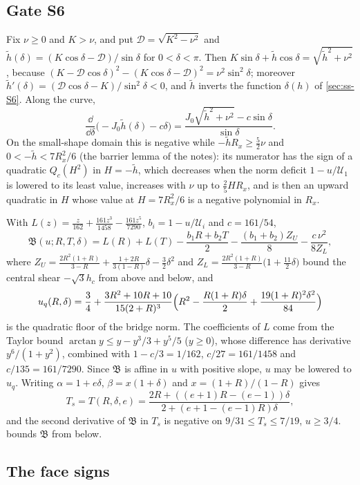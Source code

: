 \subsection{Gate S6}\label{app:ss-S6}

 Fix $\nu\ge0$ and $K>\nu$, and put $\mathcal D=\sqrt{K^2-\nu^2}$ and
$\tilde h(\delta)=(K\cos\delta-\mathcal D)/\sin\delta$ for $0<\delta<\pi$. Then
$K\sin\delta+\tilde h\cos\delta=\sqrt{\tilde h^2+\nu^2}$, because
$(K-\mathcal D\cos\delta)^2-(K\cos\delta-\mathcal D)^2=\nu^2\sin^2\delta$; moreover
$\tilde h'(\delta)=(\mathcal D\cos\delta-K)/\sin^2\delta<0$, and $\tilde h$ inverts the function
$\delta(h)$ of \cref{sec:ss-S6}. Along the curve,
\[
  \frac{\dd}{\dd\delta}\bigl(-J_0\tilde h(\delta)-c\delta\bigr)
  =\frac{J_0\sqrt{\tilde h^2+\nu^2}-c\sin\delta}{\sin\delta}.
\]
On the small-shape domain this is negative while $-\tilde hR_x\ge\frac52\nu$ and
$0<-\tilde h<7R_x^2/6$ (the barrier lemma of the notes): its numerator has the sign of a quadratic
$Q_c(H^2)$ in $H=-\tilde h$, which decreases when the norm deficit $1-u/\mathcal U_1$ is lowered to
its least value, increases with $\nu$ up to $\frac25HR_x$, and is then an upward quadratic in $H$
whose value at $H=7R_x^2/6$ is a negative polynomial in $R_x$.

 With $L(z)=\frac{z}{162}+\frac{161z^3}{1458}-\frac{161z^5}{7290}$,
$b_i=1-u/\mathcal U_i$ and $c=161/54$,
\[
  \mathfrak B(u;R,T,\delta)=L(R)+L(T)-\frac{b_1R+b_2T}{2}-\frac{(b_1+b_2)Z_U}{8}
   -\frac{c\,\nu^2}{8Z_L},
\]
where $Z_U=\frac{2R^2(1+R)}{3-R}+\frac{1+2R}{3(1-R)}\delta-\frac32\delta^2$ and
$Z_L=\frac{2R^2(1+R)}{3-R}\bigl(1+\frac{11}{2}\delta\bigr)$ bound the central shear $-\sqrt3h_c$
from above and below, and
\[
  u_q(R,\delta)=\frac34+\frac{3R^2+10R+10}{15(2+R)^3}\Bigl(R^2-\frac{R(1+R)\delta}{2}
   +\frac{19(1+R)^2\delta^2}{84}\Bigr)
\]
is the quadratic floor of the bridge norm. The coefficients of $L$ come from the Taylor bound
$\arctan y\le y-y^3/3+y^5/5$ ($y\ge0$), whose difference has derivative $y^6/(1+y^2)$, combined
with $1-c/3=1/162$, $c/27=161/1458$ and $c/135=161/7290$. Since $\mathfrak B$ is affine in $u$
with positive slope, $u$ may be lowered to $u_q$. Writing $\alpha=1+e\delta$, $\beta=x(1+\delta)$
and $x=(1+R)/(1-R)$ gives
\[
  T_s=T(R,\delta,e)=\frac{2R+((e+1)R-(e-1))\delta}{2+(e+1-(e-1)R)\delta},
\]
and the second derivative of $\mathfrak B$ in $T_s$ is negative on $9/31\le T_s\le7/19$,
$u\ge3/4$.  bounds $\mathfrak B$ from below.

\subsection{The face signs}\label{app:ss-faces}

